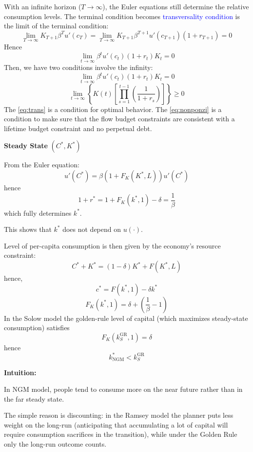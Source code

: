 With an infinite horizon ($T \to \infty$), the Euler equations still determine the relative consumption levels. The terminal condition becomes \textcolor{blue}{transversality condition} is the limit of the terminal condition:
\[ \lim_{T \to \infty} K_{T + 1}\beta^T u'(c_T) = \lim_{T \to \infty} K_{T + 1}\beta^{T + 1}u'(c_{T + 1})(1 + r_{T + 1}) = 0 \]
Hence
\[ \lim_{t \to \infty} \beta^t u'(c_t)(1 + r_t)K_t = 0 \]
Then, we have two conditions involve the infinity:
\begin{equation}
    \lim_{t \to \infty} \beta^t u'(c_t)(1 + r_t)K_t = 0 \label{eq:trans}
\end{equation}
\begin{equation}
    \lim_{t \to \infty} \left\{K(t)\left[\prod_{s = 1}^{t-1} \left(\frac{1}{1 + r_s}\right)\right]\right\} \geq 0 \label{eq:nonponzi}
\end{equation}
The \eqref{eq:trans} is a condition for optimal behavior. The \eqref{eq:nonponzi} is a condition to make sure that the flow budget constraints are consistent with a lifetime budget constraint and no perpetual debt.

\textbf{Steady State} $(C^*, K^*)$

From the Euler equation:
\[ u'(C^*) = \beta(1 + F_K(K^*, L))u'(C^*) \]
hence
\[ 1 + r^* = 1 + F_K(k^*, 1) - \delta = \frac{1}{\beta} \]
which fully determines $k^*$.

\begin{note}
This shows that $k^*$ does not depend on $u(\cdot)$.
\end{note}

Level of per-capita consumption is then given by the economy's resource constraint:
\[ C^* + K^* = (1 - \delta)K^* + F(K^*, L) \]
hence,
\[ c^* = F(k^*, 1) - \delta k^* \]
\[ F_K(k^*, 1) = \delta + \left(\frac{1}{\beta} - 1\right) \]
In the Solow model the golden-rule level of capital (which maximizes steady-state consumption) satisfies
\[ F_K(k_S^{\text{GR}}, 1) = \delta \]
hence
\[ k^*_{\text{NGM}} < k_S^{\text{GR}} \]

\begin{note}
\textbf{Intuition:}

In NGM model, people tend to consume more on the near future rather than in the far steady state.

The simple reason is discounting: in the Ramsey model the planner puts less weight on the long-run
(anticipating that accumulating a lot of capital will require consumption sacrifices in the transition), 
while under the Golden Rule only the long-run outcome counts.
\end{note}

